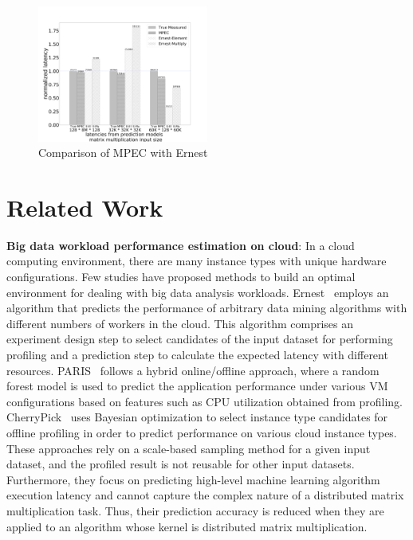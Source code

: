 \documentclass[10pt, conference, compsocconf]{IEEEtran}
\begin{document}
\begin{figure}[t]
	\centering\includegraphics[width=0.5\textwidth]{figures/MPC-Ernest-compare.pdf}\caption{Comparison of MPEC with Ernest}\label{fig:mpc-ernest}
\end{figure}

\section{Related Work}\label{sec:relatedwork}
\textbf{Big data workload performance estimation on cloud}: In a cloud computing environment, there are many instance types with unique hardware configurations. Few studies have proposed methods to build an optimal environment for dealing with big data analysis workloads. Ernest~\cite{ernest} employs an algorithm that predicts the performance of arbitrary data mining algorithms with different numbers of workers in the cloud. This algorithm comprises an experiment design step to select candidates of the input dataset for performing profiling and a prediction step to calculate the expected latency with different resources. PARIS~\cite{paris} follows a hybrid online/offline approach, where a random forest model is used to predict the application performance under various VM configurations based on features such as CPU utilization obtained from profiling. CherryPick~\cite{cherrypick} uses Bayesian optimization to select instance type candidates for offline profiling in order to predict performance on various cloud instance types. These approaches rely on a scale-based sampling method for a given input dataset, and the profiled result is not reusable for other input datasets. Furthermore, they focus on predicting high-level machine learning algorithm execution latency and cannot capture the complex nature of a distributed matrix multiplication task. Thus, their prediction accuracy is reduced when they are applied to an algorithm whose kernel is distributed matrix multiplication.
\end{document}
